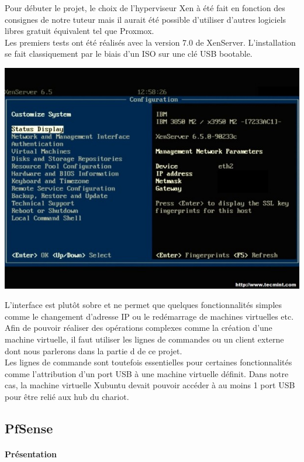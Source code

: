 \documentclass[a4paper,12pt]{extarticle}
\begin{document}
Pour débuter le projet, le choix de l’hyperviseur Xen à été fait en fonction des consignes de notre tuteur mais il aurait été possible d’utiliser d’autres logiciels libres gratuit équivalent tel que Proxmox. \\
Les premiers tests ont été réalisés avec la version 7.0 de XenServer. L’installation se fait classiquement par le biais d’un ISO sur une clé USB bootable.

\begin{center}
\includegraphics[scale=0.60]{xenserver18}\\
\end{center}

L’interface est plutôt sobre et ne permet que quelques fonctionnalités simples comme le changement d’adresse IP ou le redémarrage de machines virtuelles etc. Afin de pouvoir réaliser des opérations complexes comme la création d’une machine virtuelle, il faut utiliser les lignes de commandes ou un client externe dont nous parlerons dans la partie d de ce projet.\\

Les lignes de commande sont toutefois essentielles pour certaines fonctionnalités comme l’attribution d’un port USB à une machine virtuelle définit. Dans notre cas, la machine virtuelle Xubuntu devait pouvoir accéder à au moins 1 port USB pour être relié aux hub du chariot.

\subsection{PfSense}
\paragraph{Présentation\\}
\end{document}
